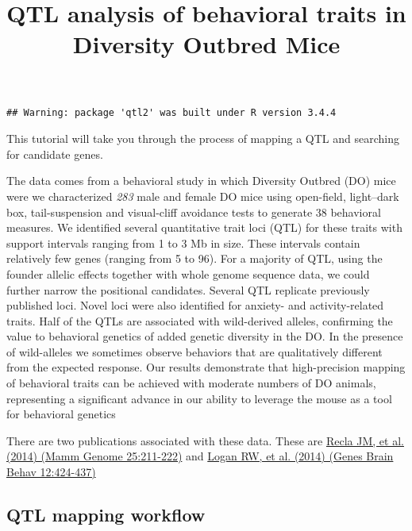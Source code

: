 \documentclass[]{article}
\title{QTL analysis of behavioral traits in Diversity Outbred Mice}
\author{}
\date{}
\begin{document}
\maketitle

\begin{verbatim}
## Warning: package 'qtl2' was built under R version 3.4.4
\end{verbatim}

This tutorial will take you through the process of mapping a QTL and
searching for candidate genes.

The data comes from a behavioral study in which Diversity Outbred (DO)
mice were we characterized \emph{283} male and female DO mice using
open-field, light--dark box, tail-suspension and visual-cliff avoidance
tests to generate 38 behavioral measures. We identified several
quantitative trait loci (QTL) for these traits with support intervals
ranging from 1 to 3 Mb in size. These intervals contain relatively few
genes (ranging from 5 to 96). For a majority of QTL, using the founder
allelic effects together with whole genome sequence data, we could
further narrow the positional candidates. Several QTL replicate
previously published loci. Novel loci were also identified for anxiety-
and activity-related traits. Half of the QTLs are associated with
wild-derived alleles, confirming the value to behavioral genetics of
added genetic diversity in the DO. In the presence of wild-alleles we
sometimes observe behaviors that are qualitatively different from the
expected response. Our results demonstrate that high-precision mapping
of behavioral traits can be achieved with moderate numbers of DO
animals, representing a significant advance in our ability to leverage
the mouse as a tool for behavioral genetics

There are two publications associated with these data. These are
\href{https://www.ncbi.nlm.nih.gov/pubmed/24700285}{Recla JM, et al.
(2014) (Mamm Genome 25:211-222)} and
\href{https://www.ncbi.nlm.nih.gov/pubmed/23433259}{Logan RW, et al.
(2014) (Genes Brain Behav 12:424-437)}

\subsection{QTL mapping workflow}\label{qtl-mapping-workflow}
\end{document}
